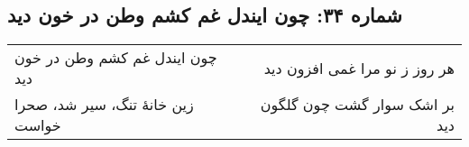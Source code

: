 \begin{center}
\section*{شماره ۳۴: چون ایندل غم کشم وطن در خون دید}
\label{sec:034}
\begin{longtable}{l p{0.5cm} r}
چون ایندل غم کشم وطن در خون دید
&&
هر روز ز نو مرا غمی افزون دید
\\
زین خانهٔ تنگ، سیر شد، صحرا خواست
&&
بر اشک سوار گشت چون گلگون دید
\\
\end{longtable}
\end{center}
